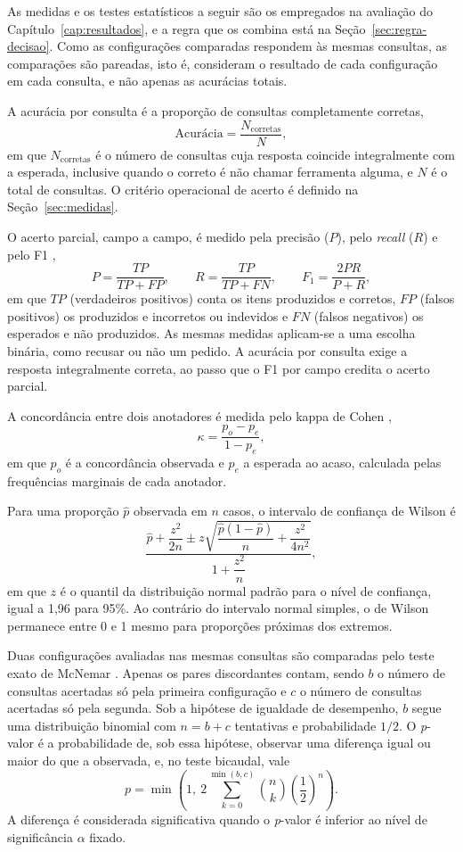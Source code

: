 As medidas e os testes estatísticos a seguir são os empregados na avaliação do Capítulo~\ref{cap:resultados}, e a regra que os combina está na Seção~\ref{sec:regra-decisao}. Como as configurações comparadas respondem às mesmas consultas, as comparações são pareadas, isto é, consideram o resultado de cada configuração em cada consulta, e não apenas as acurácias totais.

A acurácia por consulta é a proporção de consultas completamente corretas,
\[
\text{Acurácia} = \frac{N_{\text{corretas}}}{N},
\]
em que $N_{\text{corretas}}$ é o número de consultas cuja resposta coincide integralmente com a esperada, inclusive quando o correto é não chamar ferramenta alguma, e $N$ é o total de consultas. O critério operacional de acerto é definido na Seção~\ref{sec:medidas}.

O acerto parcial, campo a campo, é medido pela precisão ($P$), pelo \textit{recall} ($R$) e pelo F1 \cite{manning2008introductionir},
\[
P = \frac{TP}{TP + FP}, \qquad R = \frac{TP}{TP + FN}, \qquad F_1 = \frac{2PR}{P + R},
\]
em que $TP$ (verdadeiros positivos) conta os itens produzidos e corretos, $FP$ (falsos positivos) os produzidos e incorretos ou indevidos e $FN$ (falsos negativos) os esperados e não produzidos. As mesmas medidas aplicam-se a uma escolha binária, como recusar ou não um pedido. A acurácia por consulta exige a resposta integralmente correta, ao passo que o F1 por campo credita o acerto parcial.

A concordância entre dois anotadores é medida pelo kappa de Cohen \cite{cohen1960coefficient, artstein2008intercoder},
\[
\kappa = \frac{p_o - p_e}{1 - p_e},
\]
em que $p_o$ é a concordância observada e $p_e$ a esperada ao acaso, calculada pelas frequências marginais de cada anotador.

Para uma proporção $\hat{p}$ observada em $n$ casos, o intervalo de confiança de Wilson \cite{wilson1927probable} é
\[
\frac{\hat{p} + \dfrac{z^2}{2n} \pm z\sqrt{\dfrac{\hat{p}(1-\hat{p})}{n} + \dfrac{z^2}{4n^2}}}{1 + \dfrac{z^2}{n}},
\]
em que $z$ é o quantil da distribuição normal padrão para o nível de confiança, igual a 1,96 para 95\%. Ao contrário do intervalo normal simples, o de Wilson permanece entre 0 e 1 mesmo para proporções próximas dos extremos.

Duas configurações avaliadas nas mesmas consultas são comparadas pelo teste exato de McNemar \cite{mcnemar1947note, dietterich1998approximate}. Apenas os pares discordantes contam, sendo $b$ o número de consultas acertadas só pela primeira configuração e $c$ o número de consultas acertadas só pela segunda. Sob a hipótese de igualdade de desempenho, $b$ segue uma distribuição binomial com $n = b + c$ tentativas e probabilidade $1/2$. O \textit{p}-valor é a probabilidade de, sob essa hipótese, observar uma diferença igual ou maior do que a observada, e, no teste bicaudal, vale
\[
p = \min\left(1,\ 2\sum_{k=0}^{\min(b,c)} \binom{n}{k}\left(\frac{1}{2}\right)^{n}\right).
\]
A diferença é considerada significativa quando o \textit{p}-valor é inferior ao nível de significância $\alpha$ fixado.

